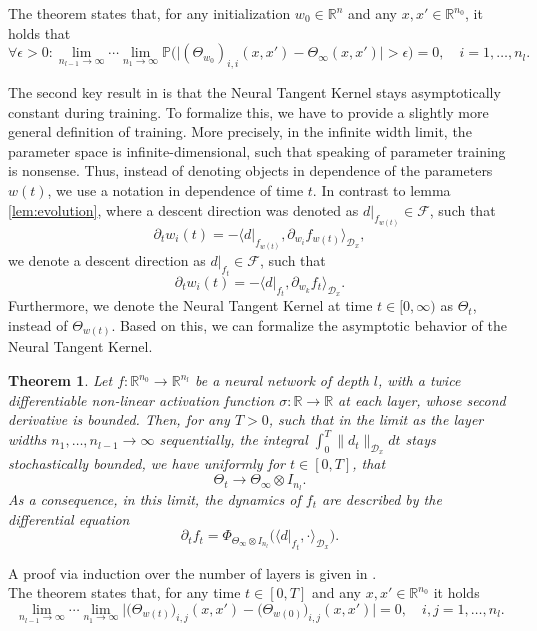 \documentclass[11pt, a4paper]{article}
\newtheorem{theorem}{Theorem}[section]
\newcommand{\R}{\mathbb{R}}
\newcommand{\D}{\mathcal{D}}
\newcommand{\F}{\mathcal{F}}
\begin{document}
The theorem states that, for any initialization $w_0 \in \R^n$ and any  $x,x' \in \R^{n_0}$, it holds that
\[ \forall \epsilon > 0 : \lim_{n_{l-1} \to \infty} \cdots \lim_{n_1 \to \infty} \mathbb{P} \Big ( \big | (\Theta_{w_0})_{i,i}(x,x') - \Theta_{\infty}(x,x') \big | > \epsilon \Big ) = 0, \quad i=1, \dots, n_l. \]

The second key result in \cite{NTK} is that the Neural Tangent Kernel stays asymptotically constant during training. To formalize this, we have to provide a slightly more general definition of training. More precisely, in the infinite width limit, the parameter space is infinite-dimensional, such that speaking of parameter training is nonsense. Thus, instead of denoting objects in dependence of the parameters $w(t)$, we use a notation in dependence of time $t$. In contrast to lemma \ref{lem:evolution}, where a descent direction was denoted as $d|_{f_{w(t)}} \in \F$, such that 
\[ \partial_tw_i(t) = - \big \langle d|_{f_{w(t)}}, \partial_{w_i} f_{w(t)} \big \rangle_{\D_x}, \]
we denote a descent direction as $d|_{f_t} \in \F$, such that
\[ \partial_tw_i(t) = - \big \langle d|_{f_t}, \partial_{w_k} f_t \big \rangle_{\D_x}. \]
Furthermore, we denote the Neural Tangent Kernel at time $t \in [0, \infty)$ as $\Theta_t$, instead of $\Theta_{w(t)}$. Based on this, we can formalize the asymptotic behavior of the Neural Tangent Kernel.

\begin{theorem} \label{thm:ntk}
Let $f: \R^{n_0} \to \R^{n_l}$ be a neural network of depth $l$, with a twice differentiable non-linear activation function $\sigma : \R \to \R$ at each layer, whose second derivative is bounded. Then, for any $T>0$, such that in the limit as the layer widths $n_1, \dots, n_{l-1} \to \infty$ sequentially, the integral $\int_{0}^{T} \| d_t \|_{\D_x}dt$ stays stochastically bounded, we have uniformly for $t \in [0,T]$, that
\[ \Theta_t \to \Theta_{\infty} \otimes I_{n_l}. \]
As a consequence, in this limit, the dynamics of $f_t$ are described by the differential equation
\[ \partial_tf_t = \Phi_{\Theta_{\infty} \otimes I_{n_l}} \Big ( \big \langle d|_{f_t}, \cdot \big \rangle_{\D_x} \Big ). \]
\end{theorem}

A proof via induction over the number of layers is given in \cite{NTK}. \\

The theorem states that, for any time $t \in [0,T]$ and any $x,x' \in \R^{n_0}$ it holds
\[ \lim_{n_{l-1} \to \infty} \cdots \lim_{n_1 \to \infty} \Big | \big (\Theta_{w(t)} \big )_{i,j}(x,x') - \big (\Theta_{w(0)} \big )_{i,j}(x,x') \Big | = 0, \quad i,j=1,\dots,n_l. \]
\end{document}
